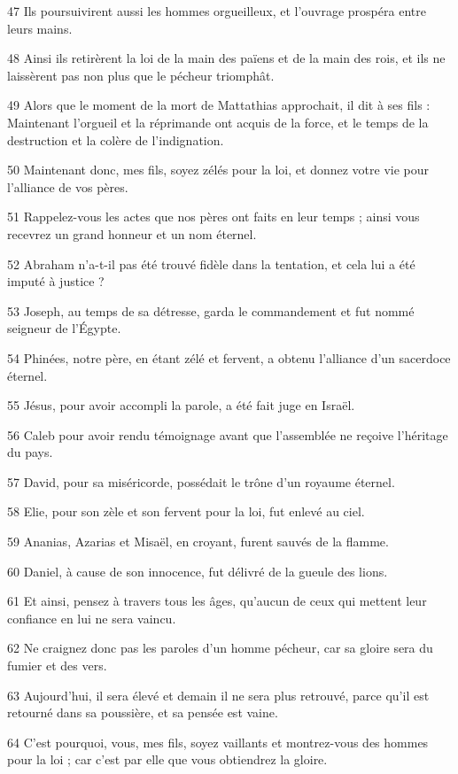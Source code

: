 \par 47 Ils poursuivirent aussi les hommes orgueilleux, et l'ouvrage prospéra entre leurs mains.
\par 48 Ainsi ils retirèrent la loi de la main des païens et de la main des rois, et ils ne laissèrent pas non plus que le pécheur triomphât.
\par 49 Alors que le moment de la mort de Mattathias approchait, il dit à ses fils : Maintenant l'orgueil et la réprimande ont acquis de la force, et le temps de la destruction et la colère de l'indignation.
\par 50 Maintenant donc, mes fils, soyez zélés pour la loi, et donnez votre vie pour l'alliance de vos pères.
\par 51 Rappelez-vous les actes que nos pères ont faits en leur temps ; ainsi vous recevrez un grand honneur et un nom éternel.
\par 52 Abraham n'a-t-il pas été trouvé fidèle dans la tentation, et cela lui a été imputé à justice ?
\par 53 Joseph, au temps de sa détresse, garda le commandement et fut nommé seigneur de l'Égypte.
\par 54 Phinées, notre père, en étant zélé et fervent, a obtenu l'alliance d'un sacerdoce éternel.
\par 55 Jésus, pour avoir accompli la parole, a été fait juge en Israël.
\par 56 Caleb pour avoir rendu témoignage avant que l'assemblée ne reçoive l'héritage du pays.
\par 57 David, pour sa miséricorde, possédait le trône d'un royaume éternel.
\par 58 Elie, pour son zèle et son fervent pour la loi, fut enlevé au ciel.
\par 59 Ananias, Azarias et Misaël, en croyant, furent sauvés de la flamme.
\par 60 Daniel, à cause de son innocence, fut délivré de la gueule des lions.
\par 61 Et ainsi, pensez à travers tous les âges, qu'aucun de ceux qui mettent leur confiance en lui ne sera vaincu.
\par 62 Ne craignez donc pas les paroles d'un homme pécheur, car sa gloire sera du fumier et des vers.
\par 63 Aujourd'hui, il sera élevé et demain il ne sera plus retrouvé, parce qu'il est retourné dans sa poussière, et sa pensée est vaine.
\par 64 C'est pourquoi, vous, mes fils, soyez vaillants et montrez-vous des hommes pour la loi ; car c'est par elle que vous obtiendrez la gloire.
